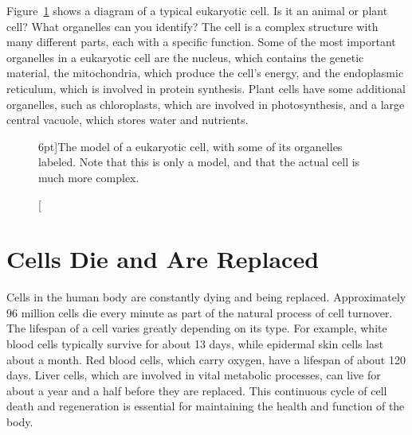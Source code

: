 Figure~\ref{fig:cell} shows a diagram of a typical eukaryotic cell. Is it an animal or plant cell? What organelles can you identify? The cell is a complex structure with many different parts, each with a specific function. Some of the most important organelles in a eukaryotic cell are the nucleus, which contains the genetic material, the mitochondria, which produce the cell's energy, and the endoplasmic reticulum, which is involved in protein synthesis. Plant cells have some additional organelles, such as chloroplasts, which are involved in photosynthesis, and a large central vacuole, which stores water and nutrients.

\begin{figure}[h!]
    \caption[][6pt]{The model of a eukaryotic cell, with some of its organelles labeled. Note that this is only a model, and that the actual cell is much more complex.}
    \label{fig:cell}
\end{figure}

\section{Cells Die and Are Replaced}

Cells in the human body are constantly dying and being replaced. Approximately 96 million cells die every minute as part of the natural process of cell turnover. The lifespan of a cell varies greatly depending on its type. For example, white blood cells typically survive for about 13 days, while epidermal skin cells last about a month. Red blood cells, which carry oxygen, have a lifespan of about 120 days. Liver cells, which are involved in vital metabolic processes, can live for about a year and a half before they are replaced. This continuous cycle of cell death and regeneration is essential for maintaining the health and function of the body.


